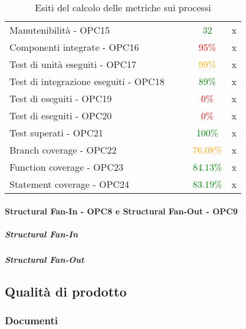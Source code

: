 \documentclass[PdQ.tex]{subfiles}
\begin{document}
\begin{table}[h]
\begin{tabular}{l c c c c}
					\rule[0cm]{0cm}{0.4cm}
					Manutenibilità - OPC15 & & & \textcolor{green}{32} & x \\
					\rule[0cm]{0cm}{0.4cm}
					Componenti integrate - OPC16 & & & \textcolor{red}{95\%} & x \\
					\rule[0cm]{0cm}{0.4cm}
					Test di unità eseguiti - OPC17 & & & \textcolor{orange}{99\%} & x \\
					\rule[0cm]{0cm}{0.4cm}
					Test di integrazione eseguiti - OPC18 & & & \textcolor{green}{89\%} & x \\
					\rule[0cm]{0cm}{0.4cm}
					Test di \gl{sistema} eseguiti - OPC19 & & & \textcolor{red}{0\%} & x \\
					\rule[0cm]{0cm}{0.4cm}
					Test di \gl{validazione} eseguiti - OPC20 & & & \textcolor{red}{0\%} & x \\
					\rule[0cm]{0cm}{0.4cm}
					Test superati - OPC21 & & & \textcolor{green}{100\%} & x \\
					\rule[0cm]{0cm}{0.4cm}
					Branch coverage - OPC22 & & & \textcolor{orange}{76.08\%} & x \\
					\rule[0cm]{0cm}{0.4cm}
					Function coverage - OPC23 & & & \textcolor{green}{84.13\%} & x \\
					\rule[0cm]{0cm}{0.4cm}
					Statement coverage - OPC24 & & & \textcolor{green}{83.19\%} & x \\

					\hline
				\end{tabular}
				\caption{Esiti del calcolo delle metriche sui processi}
			\end{table}
		\newpage
		\paragraph{Structural Fan-In - OPC8 e Structural Fan-Out - OPC9}
		\subparagraph{Structural Fan-In}
		
		\subparagraph{Structural Fan-Out}
		

\newpage
\subsection{Qualità di prodotto}
	\subsubsection{Documenti}
\end{document}
